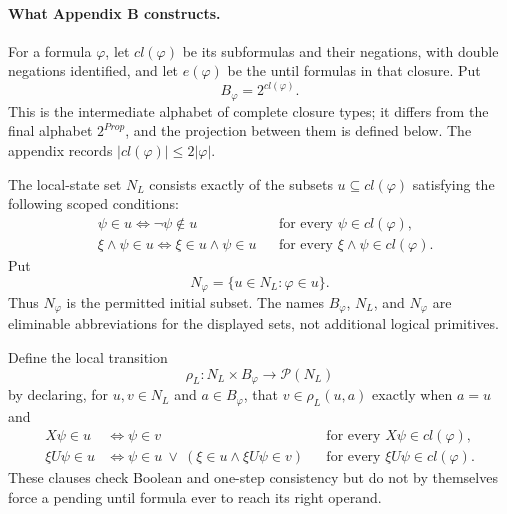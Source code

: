 \paragraph{What Appendix B constructs.}
For a formula \(\varphi\), let \(cl(\varphi)\) be its subformulas and their
negations, with double negations identified, and let \(e(\varphi)\) be the
until formulas in that closure.  Put
\[
 B_\varphi=2^{cl(\varphi)}.
\]
This is the intermediate alphabet of complete closure types; it differs from
the final alphabet \(2^{\mathit{Prop}}\), and the projection between them is
defined below.  The appendix records \(|cl(\varphi)|\le2|\varphi|\).

The local-state set \(N_L\) consists exactly of the subsets
\(u\subseteq cl(\varphi)\) satisfying the following scoped conditions:
\[
\begin{aligned}
 &\psi\in u\Longleftrightarrow\neg\psi\notin u
 &&\text{for every }\psi\in cl(\varphi),\\
 &\xi\land\psi\in u
   \Longleftrightarrow \xi\in u\land\psi\in u
 &&\text{for every }\xi\land\psi\in cl(\varphi).
\end{aligned}
\]
Put
\[
 N_\varphi=\{u\in N_L:\varphi\in u\}.
\]
Thus \(N_\varphi\) is the permitted initial subset.  The names \(B_\varphi\),
\(N_L\), and \(N_\varphi\) are eliminable abbreviations for the displayed
sets, not additional logical primitives.

Define the local transition
\[
 \rho_L:N_L\times B_\varphi\longrightarrow\mathcal P(N_L)
\]
by declaring, for \(u,v\in N_L\) and \(a\in B_\varphi\), that
\(v\in\rho_L(u,a)\) exactly when \(a=u\) and
\[
\begin{aligned}
 X\psi\in u
 &\Longleftrightarrow \psi\in v
 &&\text{for every }X\psi\in cl(\varphi),\\
 \xi U\psi\in u
 &\Longleftrightarrow
   \psi\in u\ \lor\
   (\xi\in u\land \xi U\psi\in v)
 &&\text{for every }\xi U\psi\in cl(\varphi).
\end{aligned}
\]
These clauses check Boolean and one-step consistency but do not by themselves
force a pending until formula ever to reach its right operand.

